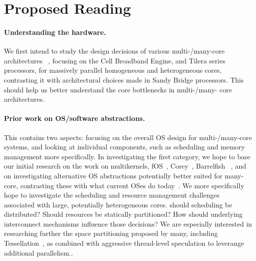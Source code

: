 \section{Proposed Reading}
\label{sec:reading}

\paragraph{Understanding the hardware.}
We first intend to study the design decisions of various multi-/many-core
architectures ~\cite{Re:12,KTJR:05,BRUL:05,Va:11}, focusing on the Cell Broadband Engine, and Tilera series
processors, for massively parallel homogeneous and heterogeneous cores,
contrasting it with architectural choices made in Sandy Bridge processors.
This should help us better understand the core bottlenecks in multi-/many-
core architectures.

\paragraph{Prior work on OS/software abstractions.}
This contains two aspects: focusing on the overall OS design for multi-/many-core
systems, and looking 
at individual components, such as scheduling and memory management more
specifically. In investigating the first category, we hope to
base our initial research on the work on multikernels, fOS~\cite{WC:10}, Corey~\cite{BW08},
 Barrelfish ~\cite{SPBRBHI:08,BBDHIPRSS:09},
and on investigating alternative OS abstractions potentially better suited for many-core, 
contrasting these with  what current OSes do today~\cite{BW:10}.
  We more specifically hope to investigate
the scheduling and resource management challenges associated with large, potentially heterogeneous cores.
should scheduling be distributed? Should resources be statically partitioned? How should underlying interconnect mechanisms influence those decisions? 
We are especially interested in researching further the space partitioning
proposed by many, including Tessellation~\cite{LKBHAK:09}, as combined with aggressive thread-level speculation to leverange additional parallelism..

